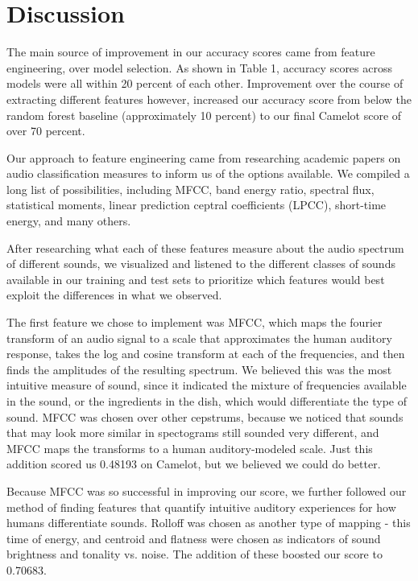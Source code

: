 \documentclass[11pt]{article}
\begin{document}
\section{Discussion} 



The main source of improvement in our accuracy scores came from feature engineering, over model selection. As shown in Table 1, accuracy scores across models were all within 20 percent of each other. Improvement over the course of extracting different features however, increased our accuracy score from below the random forest baseline (approximately 10 percent) to our final Camelot score of over 70 percent.

Our approach to feature engineering came from researching academic papers on audio classification measures to inform us of the options available. We compiled a long list of possibilities, including MFCC, band energy ratio, spectral flux, statistical moments, linear prediction ceptral coefficients (LPCC), short-time energy, and many others. 

After researching what each of these features measure about the audio spectrum of different sounds, we visualized and listened to the different classes of sounds available in our training and test sets to prioritize which features would best exploit the differences in what we observed.

The first feature we chose to implement was MFCC, which maps the fourier transform of an audio signal to a scale that approximates the human auditory response, takes the log and cosine transform at each of the frequencies, and then finds the amplitudes of the resulting spectrum. We believed this was the most intuitive measure of sound, since it indicated the mixture of frequencies available in the sound, or the ingredients in the dish, which would differentiate the type of sound. MFCC was chosen over other cepstrums, because we noticed that sounds that may look more similar in spectograms still sounded very different, and MFCC maps the transforms to a human auditory-modeled scale. Just this addition scored us 0.48193 on Camelot, but we believed we could do better.

Because MFCC was so successful in improving our score, we further followed our method of finding features that quantify intuitive auditory experiences for how humans differentiate sounds. Rolloff was chosen as another type of mapping - this time of energy, and centroid and flatness were chosen as indicators of sound brightness and tonality vs. noise. The addition of these boosted our score to 0.70683.
\end{document}
